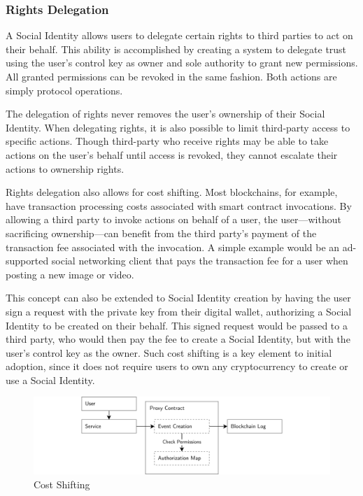 \documentclass[12pt,letterpaper]{article}
\begin{document}
\subsubsection{Rights Delegation}

A Social Identity allows users to delegate certain rights to third parties to act on their
behalf. This ability is accomplished by creating a system to delegate trust using the user's
control key as owner and sole authority to grant new permissions. All granted permissions
can be revoked in the same fashion. Both actions are simply protocol operations.

The delegation of rights never removes the user's ownership of their Social Identity. When
delegating rights, it is also possible to limit third-party access to specific actions.
Though third-party  who receive rights may be able to take actions on the
user's behalf until access is revoked, they cannot escalate their actions to ownership
rights.

Rights delegation also allows for cost shifting. Most blockchains, for example, have
transaction processing costs associated with smart contract invocations. By allowing a third
party to invoke actions on behalf of a user, the user---without sacrificing ownership---can
benefit from the third party's payment of the transaction fee associated with the
invocation. A simple example would be an ad-supported social networking client that pays the
transaction fee for a user when posting a new image or video.

This concept can also be extended to Social Identity creation by having the user sign a
request with the private key from their digital wallet, authorizing a Social Identity to be
created on their behalf. This signed request would be passed to a third party, who would
then pay the fee to create a Social Identity, but with the user's control key as the
owner. Such cost shifting is a key element to initial adoption, since it does not require
users to own any cryptocurrency to create or use a Social Identity.

\begin{figure}
	\includegraphics[width=\linewidth]{figures/Cost Shifting.png}
	\caption{Cost Shifting}
	\label{fig:2}
\end{figure}
\end{document}
